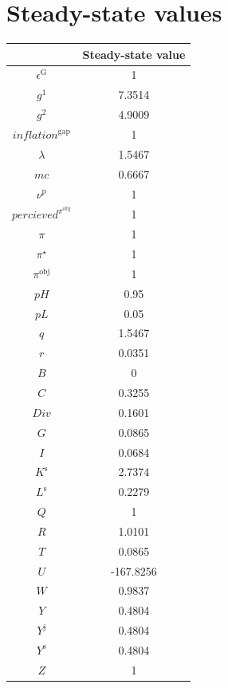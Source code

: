 

\section{Steady-state values}


\begin{tabular}{c|c|}
  & Steady-state value\\
\hline
$\epsilon^{\mathrm{G}}$ & 1 \\
$g^{\mathrm{1}}$ & 7.3514 \\
$g^{\mathrm{2}}$ & 4.9009 \\
${i\!n\!f\!l\!a\!t\!i\!o\!n}^{\mathrm{gap}}$ & 1 \\
$\lambda$ & 1.5467 \\
${m\!c}$ & 0.6667 \\
$\nu^{\mathrm{p}}$ & 1 \\
${p\!e\!r\!c\!i\!e\!v\!e\!d}^{\pi^{\mathrm{obj}}}$ & 1 \\
$\pi$ & 1 \\
$\pi^{\star}$ & 1 \\
$\pi^{\mathrm{obj}}$ & 1 \\
${p\!H}$ & 0.95 \\
${p\!L}$ & 0.05 \\
$q$ & 1.5467 \\
$r$ & 0.0351 \\
$B$ & 0 \\
$C$ & 0.3255 \\
${D\!i\!v}$ & 0.1601 \\
$G$ & 0.0865 \\
$I$ & 0.0684 \\
$K^{\mathrm{s}}$ & 2.7374 \\
$L^{\mathrm{s}}$ & 0.2279 \\
$Q$ & 1 \\
$R$ & 1.0101 \\
$T$ & 0.0865 \\
$U$ & -167.8256 \\
$W$ & 0.9837 \\
$Y$ & 0.4804 \\
$Y^{\mathrm{j}}$ & 0.4804 \\
$Y^{\mathrm{s}}$ & 0.4804 \\
$Z$ & 1 \\
\hline
\end{tabular}


